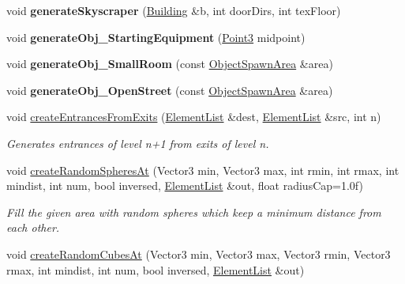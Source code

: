 \begin{DoxyCompactItemize}
\item 
\hypertarget{classLevel_a443d93952f09f39762a14ce29ad1fc28}{
void {\bfseries generate\-Skyscraper} (\hyperlink{structLevel_1_1Building}{\-Building} \&b, int door\-Dirs, int tex\-Floor)}
\label{d2/d9d/classLevel_a443d93952f09f39762a14ce29ad1fc28}

\item 
\hypertarget{classLevel_a7638c5ac622464c69e568e293511dfda}{
void {\bfseries generate\-Obj\-\_\-\-Starting\-Equipment} (\hyperlink{classPoint3}{\-Point3} midpoint)}
\label{d2/d9d/classLevel_a7638c5ac622464c69e568e293511dfda}

\item 
\hypertarget{classLevel_a4d7c8e304c3c2ffd664e34980b845655}{
void {\bfseries generate\-Obj\-\_\-\-Small\-Room} (const \hyperlink{classObjectSpawnArea}{\-Object\-Spawn\-Area} \&area)}
\label{d2/d9d/classLevel_a4d7c8e304c3c2ffd664e34980b845655}

\item 
\hypertarget{classLevel_acbbc46b52cf383aea1e499e94c5483ab}{
void {\bfseries generate\-Obj\-\_\-\-Open\-Street} (const \hyperlink{classObjectSpawnArea}{\-Object\-Spawn\-Area} \&area)}
\label{d2/d9d/classLevel_acbbc46b52cf383aea1e499e94c5483ab}

\item 
\hypertarget{classLevel_a17b0222a7bbc0453c137a072dccd8d36}{
void \hyperlink{classLevel_a17b0222a7bbc0453c137a072dccd8d36}{create\-Entrances\-From\-Exits} (\hyperlink{classLevel_acfda2c619231d9623457ebb133ef6b84}{\-Element\-List} \&dest, \hyperlink{classLevel_acfda2c619231d9623457ebb133ef6b84}{\-Element\-List} \&src, int n)}
\label{d2/d9d/classLevel_a17b0222a7bbc0453c137a072dccd8d36}

\begin{DoxyCompactList}\small\item\em \-Generates entrances of level n+1 from exits of level n. \end{DoxyCompactList}\item 
\hypertarget{classLevel_ab23ec9b0fd08c6fe617464d7adb6e964}{
void \hyperlink{classLevel_ab23ec9b0fd08c6fe617464d7adb6e964}{create\-Random\-Spheres\-At} (\-Vector3 min, \-Vector3 max, int rmin, int rmax, int mindist, int num, bool inversed, \hyperlink{classLevel_acfda2c619231d9623457ebb133ef6b84}{\-Element\-List} \&out, float radius\-Cap=1.\-0f)}
\label{d2/d9d/classLevel_ab23ec9b0fd08c6fe617464d7adb6e964}

\begin{DoxyCompactList}\small\item\em \-Fill the given area with random spheres which keep a minimum distance from each other. \end{DoxyCompactList}\item 
\hypertarget{classLevel_aa57d8167606982c9d71bb0087977b506}{
void \hyperlink{classLevel_aa57d8167606982c9d71bb0087977b506}{create\-Random\-Cubes\-At} (\-Vector3 min, \-Vector3 max, \-Vector3 rmin, \-Vector3 rmax, int mindist, int num, bool inversed, \hyperlink{classLevel_acfda2c619231d9623457ebb133ef6b84}{\-Element\-List} \&out)}
\label{d2/d9d/classLevel_aa57d8167606982c9d71bb0087977b506}


\end{DoxyCompactItemize}
